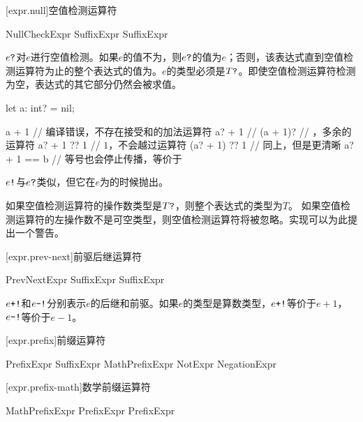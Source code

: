 [expr.null]{空值检测运算符}

\begin{bnf}{NullCheckExpr}
    SuffixExpr  \br
    SuffixExpr \terminal{!}
\end{bnf}

\pnum
$e\texttt{?}$对$e$进行空值检测。如果$e$的值不为，则$e\texttt{?}$的值为$e$；否则，该表达式直到空值检测运算符为止的整个表达式的值为。$e$的类型必须是$T\texttt{?}$。即使空值检测运算符检测为空，表达式的其它部分仍然会被求值。

\enterexample
\begin{codeblock}
let a: int? = nil;

a + 1 // 编译错误，不存在接受和的加法运算符
a? + 1 // 
(a + 1)? // ，多余的运算符
a? + 1 ?? 1 // $1$，不会越过运算符
(a? + 1) ?? 1 // 同上，但是更清晰
a? + 1 == b // 等号也会停止传播，等价于
\end{codeblock}
\exitexample

\pnum
$e\texttt{!}$与$e\texttt{?}$类似，但它在$e$为的时候抛出。

\pnum
如果空值检测运算符的操作数类型是$T\texttt{?}$，则整个表达式的类型为$T$。
如果空值检测运算符的左操作数不是可空类型，则空值检测运算符将被忽略。实现可以为此提出一个警告。

[expr.prev-next]{前驱后继运算符}

\begin{bnf}{PrevNextExpr}
    SuffixExpr \terminal{+!} \br
    SuffixExpr \terminal{-!}
\end{bnf}

\pnum
$e\texttt{+!}$和$e\texttt{-!}$分别表示$e$的后继和前驱。如果$e$的类型是算数类型，$e\texttt{+!}$等价于$e+1$，$e\texttt{-!}$等价于$e-1$。

[expr.prefix]{前缀运算符}

\begin{bnf}{PrefixExpr}
    SuffixExpr \br
    MathPrefixExpr \br
    NotExpr \br
    NegationExpr
\end{bnf}

[expr.prefix-math]{数学前缀运算符}

\begin{bnf}{MathPrefixExpr}
    \terminal{+} PrefixExpr \br
    \terminal{-} PrefixExpr
\end{bnf}

